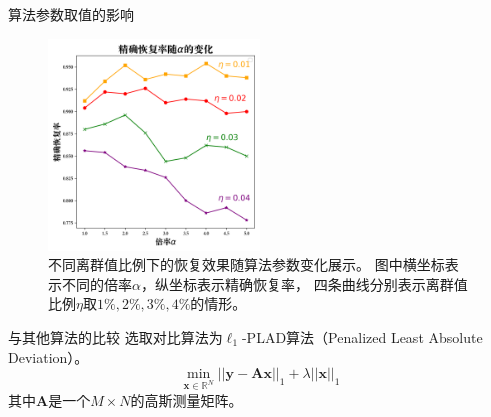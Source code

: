 \documentclass{ldr-simple-gray}
\begin{document}
\begin{frame}{算法参数取值的影响}
    \begin{figure}[H]
        \centering
        \includegraphics[width=0.5\textwidth]{figures/diff_alpha.png}
        \caption{不同离群值比例下的恢复效果随算法参数变化展示。
            图中横坐标表示不同的倍率$\alpha$，纵坐标表示精确恢复率，
            四条曲线分别表示离群值比例$\eta$取$1\%, 2\%, 3\%, 4\%$的情形。
            }
        \label{fig_diff_alg}
    \end{figure}
\end{frame}

\begin{frame}{与其他算法的比较}
    选取对比算法为$\ell_1$-PLAD算法（Penalized Least Absolute Deviation）。
    \begin{equation*}
        \min_{\mathbf{x} \in \mathbb{R}^N}{||\mathbf{y} - \mathbf{Ax}||_1 + \lambda ||\mathbf{x}||_1}
    \end{equation*}
    其中$\mathbf{A}$是一个$M \times N$的高斯测量矩阵。

    \begin{table}[H]
        \centering
        \caption{PAMQ算法与PLAD算法的对比}
        \label{diff_algs}
    \end{table}
\end{frame}
\end{document}
